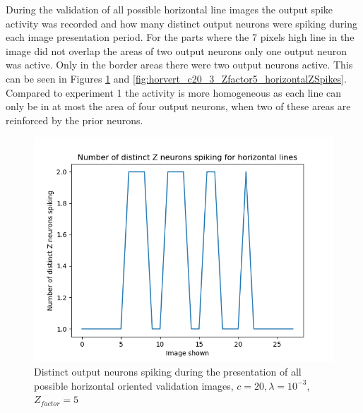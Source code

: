 During the validation of all possible horizontal line images the output spike activity was recorded and how many distinct output neurons were spiking during each image presentation period. For the parts where the 7 pixels high line in the image did not overlap the areas of two output neurons only one output neuron was active. Only in the border areas there were two output neurons active. This can be seen in Figures \ref{fig:horvert_c20_3_Zfactor5_horizontalDistinctZ} and \ref{fig:horvert_c20_3_Zfactor5_horizontalZSpikes}. Compared to experiment 1 the activity is more homogeneous as each line can only be in at most the area of four output neurons, when two of these areas are reinforced by the prior neurons.

\begin{figure}
  \includegraphics[width=\linewidth]{figures/horvert/horvert_c20_3_Zfactor5_horizontalDistinctZ.png}
  \caption{Distinct output neurons spiking during the presentation of all possible horizontal oriented validation images, $c = 20, \lambda = 10^{-3}$, $Z_{factor} = 5$}
  \label{fig:horvert_c20_3_Zfactor5_horizontalDistinctZ}
\end{figure}
